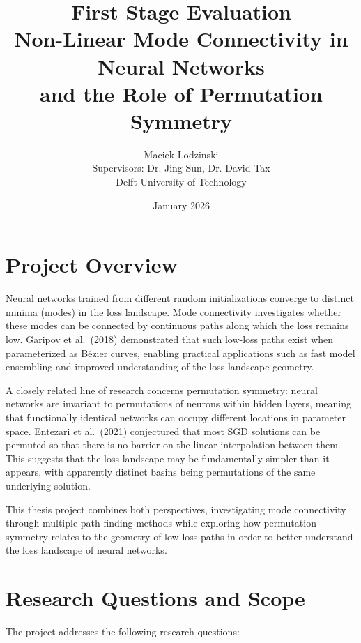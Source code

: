 \documentclass[11pt,a4paper]{article}
\title{First Stage Evaluation\\[0.3cm]
\large Non-Linear Mode Connectivity in Neural Networks\\and the Role of Permutation Symmetry}
\author{Maciek Lodzinski\\[0.2cm]
\small Supervisors: Dr. Jing Sun, Dr. David Tax\\
\small Delft University of Technology}
\date{January 2026}
\begin{document}
\maketitle

\tableofcontents
\newpage

\section{Project Overview}

Neural networks trained from different random initializations converge to distinct minima (modes) in the loss landscape. Mode connectivity investigates whether these modes can be connected by continuous paths along which the loss remains low. Garipov et al.\ (2018) demonstrated that such low-loss paths exist when parameterized as B\'{e}zier curves, enabling practical applications such as fast model ensembling and improved understanding of the loss landscape geometry.

A closely related line of research concerns permutation symmetry: neural networks are invariant to permutations of neurons within hidden layers, meaning that functionally identical networks can occupy different locations in parameter space. Entezari et al.\ (2021) conjectured that most SGD solutions can be permuted so that there is no barrier on the linear interpolation between them. This suggests that the loss landscape may be fundamentally simpler than it appears, with apparently distinct basins being permutations of the same underlying solution.

This thesis project combines both perspectives, investigating mode connectivity through multiple path-finding methods while exploring how permutation symmetry relates to the geometry of low-loss paths in order to better understand the loss landscape of neural networks.

\section{Research Questions and Scope}

The project addresses the following research questions:
\end{document}
